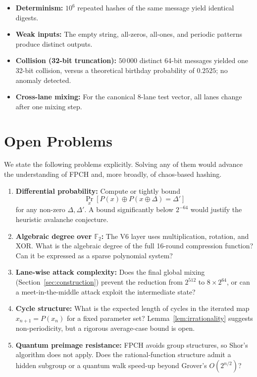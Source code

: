 \documentclass[11pt,a4paper]{article}
\theoremstyle{plain}
\theoremstyle{definition}
\theoremstyle{remark}
\begin{document}
\begin{itemize}
    \item \textbf{Determinism:} $10^6$ repeated hashes of the same message yield identical digests.
    \item \textbf{Weak inputs:} The empty string, all-zeros, all-ones, and periodic patterns produce distinct outputs.
    \item \textbf{Collision (32-bit truncation):} $50\,000$ distinct 64-bit messages yielded one 32-bit collision, versus a theoretical birthday probability of $0.2525$; no anomaly detected.
    \item \textbf{Cross-lane mixing:} For the canonical 8-lane test vector, all lanes change after one mixing step.
\end{itemize}

\section{Open Problems}\label{sec:open}

We state the following problems explicitly. Solving any of them would advance the understanding of FPCH and, more broadly, of chaos-based hashing.

\begin{enumerate}
    \item \textbf{Differential probability:} Compute or tightly bound
    \[
    \Pr_{x}[P(x) \oplus P(x \oplus \Delta) = \Delta']
    \]
    for any non-zero $\Delta, \Delta'$. A bound significantly below $2^{-64}$ would justify the heuristic avalanche conjecture.
    \item \textbf{Algebraic degree over $\mathbb{F}_2$:} The V6 layer uses multiplication, rotation, and XOR. What is the algebraic degree of the full 16-round compression function? Can it be expressed as a sparse polynomial system?
    \item \textbf{Lane-wise attack complexity:} Does the final global mixing (Section~\ref{sec:construction}) prevent the reduction from $2^{512}$ to $8 \times 2^{64}$, or can a meet-in-the-middle attack exploit the intermediate state?
    \item \textbf{Cycle structure:} What is the expected length of cycles in the iterated map $x_{n+1} = P(x_n)$ for a fixed parameter set? Lemma~\ref{lem:irrationality} suggests non-periodicity, but a rigorous average-case bound is open.
    \item \textbf{Quantum preimage resistance:} FPCH avoids group structures, so Shor's algorithm does not apply. Does the rational-function structure admit a hidden subgroup or a quantum walk speed-up beyond Grover's $O(2^{n/2})$?
\end{enumerate}
\end{document}
